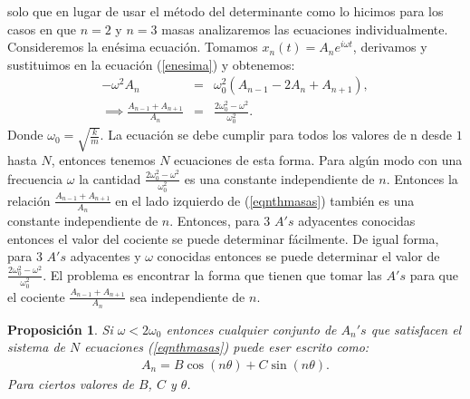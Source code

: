 \documentclass[letterpaper,12pt,oneside]{book}
\newtheorem{proposition}{Proposici\'on}[section]
\begin{document}
%
solo que en lugar de usar el m\'etodo del determinante como lo hicimos para los casos en que $n=2$ y $n=3$ masas analizaremos las ecuaciones individualmente. Consideremos la en\'esima ecuaci\'on. Tomamos $x_n(t) = A_n e^{i\omega t}$, derivamos y sustituimos en la ecuaci\'on (\ref{enesima}) y obtenemos:
%
\begin{eqnarray}
-\omega^2 A_n &=& \omega_0^2(A_{n-1}-2A_n+A_{n+1}),\\
\implies \frac{A_{n-1}+A_{n+1}}{A_n} &=& \frac{2\omega_0^2-\omega^2}{\omega_0^2}\label{eqnthmasas}.
\end{eqnarray}
%
Donde $\omega_0 = \sqrt{\frac{k}{m}}$. La ecuaci\'on se debe cumplir para todos los valores de n desde $1$ hasta $N$, entonces tenemos $N$ ecuaciones de esta forma. Para alg\'un modo con una frecuencia $\omega$ la cantidad $\frac{2\omega_0^2-\omega^2}{\omega_0^2}$ es una constante independiente de $n$. Entonces la relaci\'on $\frac{A_{n-1}+A_{n+1}}{A_n}$ en el lado izquierdo de (\ref{eqnthmasas}) tambi\'en es una constante independiente de $n$. Entonces, para 3 $A's$ adyacentes conocidas entonces el valor del cociente se puede determinar f\'acilmente. De igual forma, para 3 $A's$ adyacentes y $\omega$ conocidas entonces se puede determinar el valor de $\frac{2\omega_0^2-\omega^2}{\omega_0^2}$. El problema es encontrar la forma que tienen que tomar las $A's$ para que el cociente $\frac{A_{n-1}+A_{n+1}}{A_n}$ sea independiente de $n$.
%
\begin{proposition}
Si $\omega < 2\omega_0$ entonces cualquier conjunto de $A_n's$ que satisfacen el sistema de $N$ ecuaciones (\ref{eqnthmasas}) puede eser escrito como:
%
\begin{eqnarray}
A_n=B\cos(n\theta)+C\sin(n\theta).\label{inductiva}
\end{eqnarray}
%
Para ciertos valores de $B$, $C$ y $\theta$. 
%
\end{proposition}
%
\end{document}
